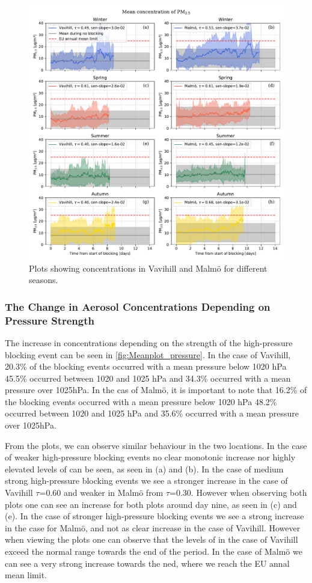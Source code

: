 \begin{figure}[H]
    \centering
    \includegraphics[width=\textwidth]{Figures/Meanplot_seasonal.pdf}
    \caption{Plots showing \PM concentrations in Vavihill and Malmö for different seasons. }
    \label{fig:Meanplot_seasonal}
\end{figure}
 

\subsubsection{The Change in Aerosol Concentrations Depending on Pressure Strength}
The increase in \PM  concentrations depending on the strength of the high-pressure blocking event can be seen in \autoref{fig:Meanplot_pressure}. In the case of Vavihill, 20.3\% of the blocking events occurred with a mean pressure below 1020 hPa 45.5\% occurred between 1020 and 1025 hPa and 34.3\% occurred with a mean pressure over 1025hPa. In the cas of Malmö, it is important to note that 16.2\% of the blocking events occurred with a mean pressure below 1020 hPa 48.2\% occurred between 1020 and 1025 hPa and 35.6\% occurred with a mean pressure over 1025hPa.

From the plots, we can observe similar behaviour in the two locations. In the case of weaker high-pressure blocking events no clear monotonic increase nor highly elevated levels of \PM can be seen, as seen in (a) and (b). In the case of medium strong high-pressure blocking events we see a stronger increase in the case of Vavihill $\tau$=0.60 and weaker in Malmö from $\tau$=0.30. However when observing both plots one can see an increase for both plots around day nine, as seen in (c) and (e). In the case of stronger high-pressure blocking events we see a strong increase in the case for Malmö, and not as clear increase in the case of Vavihill. However when viewing the plots one can observe that the levels of \PM in the case of Vavihill exceed the normal range towards the end of the period. In the case of Malmö we can see a very strong increase towards the ned, where we reach the EU annal mean limit. 

